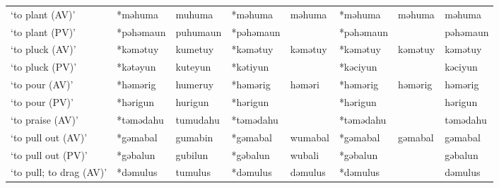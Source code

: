 \begin{landscape}
\begin{longtable}[c]{@{}p{3cm}<{\raggedright}p{2.75cm}<{\raggedright}p{2.75cm}<{\raggedright}p{2.75cm}<{\raggedright}p{2.75cm}<{\raggedright}p{2.75cm}<{\raggedright}p{2.75cm}<{\raggedright}p{2.75cm}<{\raggedright}@{}}
`to plant (AV)'                                      & *məhuma            & muhuma                         & *məhuma            & məhuma                     & *məhuma          & məhuma                   & məhuma                            \\
`to plant (PV)'                                      & *pəhəmaun          & puhumaun                       & *pəhəmaun          &                            & *pəhəmaun        &                          & pəhəmaun                          \\
`to pluck (AV)'                                      & *kəmətuy           & kumetuy                        & *kəmətuy           & kəmətuy                    & *kəmətuy         & kəmətuy                  & kəmətuy                           \\
`to pluck (PV)'                                      & *kətəyun           & kuteyun                        & *kətiyun           &                            & *kəciyun         &                          & kəciyun                           \\
`to pour (AV)'                                       & *həmərig           & humeruy                        & *həmərig           & həməri                     & *həmərig         & həmərig                  & həmərig                           \\
`to pour (PV)'                                       & *hərigun           & hurigun                        & *hərigun           &                            & *hərigun         &                          & hərigun                           \\
`to praise (AV)'                                     & *təmədahu          & tumudahu                       & *təmədahu          &                            & *təmədahu        &                          & təmədahu                          \\
`to pull out (AV)'                                   & *gəmabal           & gumabin                        & *gəmabal           & wumabal                    & *gəmabal         & gəmabal                  & gəmabal                           \\
`to pull out (PV)'                                   & *gəbalun           & gubilun                        & *gəbalun           & wubali                     & *gəbalun         &                          & gəbalun                           \\
`to pull; to drag (AV)'                              & *dəmulus           & tumulus                        & *dəmulus           & dəmulus                    & *dəmulus         &                          & dəmulus                           \\

\end{longtable}
\end{landscape}
